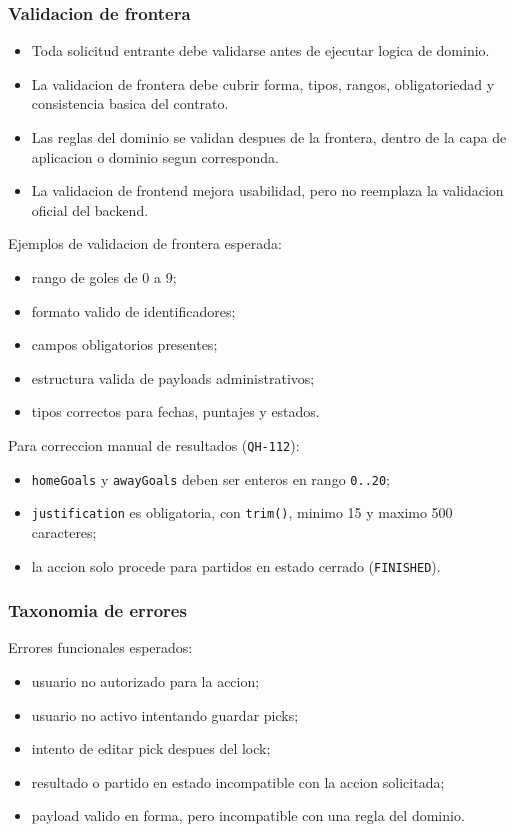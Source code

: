 \subsubsection{Validacion de frontera}

\begin{itemize}
  \item Toda solicitud entrante debe validarse antes de ejecutar logica de dominio.
  \item La validacion de frontera debe cubrir forma, tipos, rangos, obligatoriedad y consistencia basica del contrato.
  \item Las reglas del dominio se validan despues de la frontera, dentro de la capa de aplicacion o dominio segun corresponda.
  \item La validacion de frontend mejora usabilidad, pero no reemplaza la validacion oficial del backend.
\end{itemize}

Ejemplos de validacion de frontera esperada:

\begin{itemize}
  \item rango de goles de 0 a 9;
  \item formato valido de identificadores;
  \item campos obligatorios presentes;
  \item estructura valida de payloads administrativos;
  \item tipos correctos para fechas, puntajes y estados.
\end{itemize}

Para correccion manual de resultados (\texttt{QH-112}):
\begin{itemize}
  \item \texttt{homeGoals} y \texttt{awayGoals} deben ser enteros en rango \texttt{0..20};
  \item \texttt{justification} es obligatoria, con \texttt{trim()}, minimo 15 y maximo 500 caracteres;
  \item la accion solo procede para partidos en estado cerrado (\texttt{FINISHED}).
\end{itemize}

\subsubsection{Taxonomia de errores}

Errores funcionales esperados:

\begin{itemize}
  \item usuario no autorizado para la accion;
  \item usuario no activo intentando guardar picks;
  \item intento de editar pick despues del lock;
  \item resultado o partido en estado incompatible con la accion solicitada;
  \item payload valido en forma, pero incompatible con una regla del dominio.
\end{itemize}

